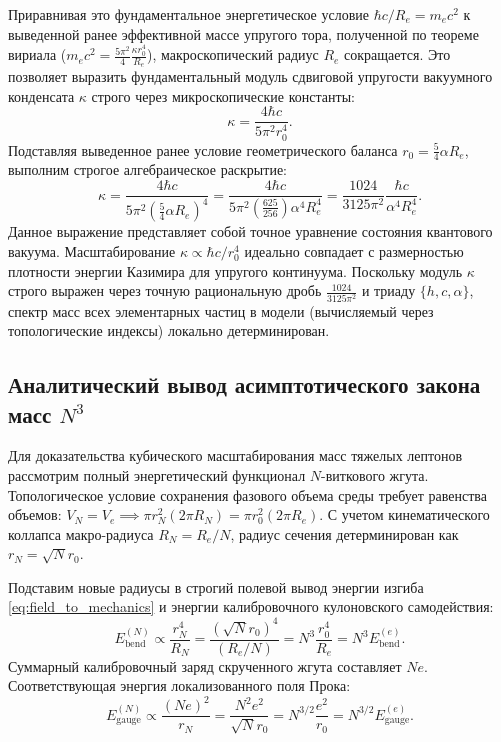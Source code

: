 \documentclass[11pt,a4paper]{article}
\begin{document}
	Приравнивая это фундаментальное энергетическое условие $\hbar c / R_e = m_e c^2$ к выведенной ранее эффективной массе упругого тора, полученной по теореме вириала ($m_e c^2 = \frac{5\pi^2}{4} \frac{\kappa r_0^4}{R_e}$), макроскопический радиус $R_e$ сокращается. Это позволяет выразить фундаментальный модуль сдвиговой упругости вакуумного конденсата $\kappa$ строго через микроскопические константы:
	\begin{equation}
		\kappa = \frac{4 \hbar c}{5\pi^2 r_0^4}.
	\end{equation}
	Подставляя выведенное ранее условие геометрического баланса $r_0 = \frac{5}{4}\alpha R_e$, выполним строгое алгебраическое раскрытие:
	\begin{equation}
		\kappa = \frac{4 \hbar c}{5\pi^2 \left( \frac{5}{4}\alpha R_e \right)^4} = \frac{4 \hbar c}{5\pi^2 \left( \frac{625}{256} \right) \alpha^4 R_e^4} = \frac{1024}{3125 \pi^2} \frac{\hbar c}{\alpha^4 R_e^4}.
	\end{equation}
	Данное выражение представляет собой точное уравнение состояния квантового вакуума. Масштабирование $\kappa \propto \hbar c / r_0^4$ идеально совпадает с размерностью плотности энергии Казимира для упругого континуума. 
	Поскольку модуль $\kappa$ строго выражен через точную рациональную дробь $\frac{1024}{3125\pi^2}$ и триаду $\{h, c, \alpha\}$, спектр масс всех элементарных частиц в модели (вычисляемый через топологические индексы) локально детерминирован.
	
	\subsection{Аналитический вывод асимптотического закона масс $N^3$}
	Для доказательства кубического масштабирования масс тяжелых лептонов рассмотрим полный энергетический функционал $N$-виткового жгута. Топологическое условие сохранения фазового объема среды требует равенства объемов: $V_N = V_e \implies \pi r_N^2 (2\pi R_N) = \pi r_0^2 (2\pi R_e)$. С учетом кинематического коллапса макро-радиуса $R_N = R_e / N$, радиус сечения детерминирован как $r_N = \sqrt{N} r_0$.
	
	Подставим новые радиусы в строгий полевой вывод энергии изгиба \eqref{eq:field_to_mechanics} и энергии калибровочного кулоновского самодействия:
	\begin{equation}
		E_{\text{bend}}^{(N)} \propto \frac{r_N^4}{R_N} = \frac{(\sqrt{N} r_0)^4}{(R_e / N)} = N^3 \frac{r_0^4}{R_e} = N^3 E_{\text{bend}}^{(e)}.
	\end{equation}
	Суммарный калибровочный заряд скрученного жгута составляет $N e$. Соответствующая энергия локализованного поля Прока:
	\begin{equation}
		E_{\text{gauge}}^{(N)} \propto \frac{(Ne)^2}{r_N} = \frac{N^2 e^2}{\sqrt{N} r_0} = N^{3/2} \frac{e^2}{r_0} = N^{3/2} E_{\text{gauge}}^{(e)}.
	\end{equation}
	
\end{document}
